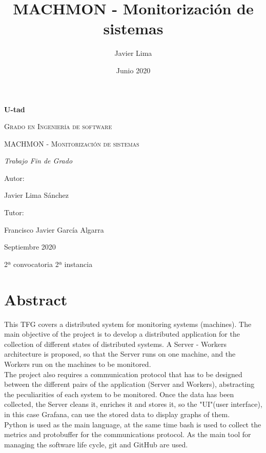 \documentclass[ spanish, a4paper, 12pt, oneside]{report}
\title{\Huge MACHMON - Monitorización de sistemas }
\author{Javier Lima}
\date{Junio 2020}
\begin{document}
\begin{titlepage}
   \centering
   {\bfseries\LARGE U-tad \par}
   \vspace{1cm}
   {\scshape\Large Grado en Ingeniería de software \par}
   \vspace{3cm}
   {\scshape\Huge MACHMON - Monitorización de sistemas \par}
   \vspace{3cm}
   {\itshape\Large Trabajo Fin de Grado \par}
   \vfill
   {\Large Autor: \par}
   {\Large Javier Lima Sánchez\par}
   \vspace{1cm}
   {\Large Tutor: \par}
   {\Large Francisco Javier García Algarra\par}
   \vfill
   {\Large Septiembre 2020\par}
   {\Large 2ª convocatoria 2ª instancia\par}
\end{titlepage}

\tableofcontents{}
\listoffigures
\newpage

\chapter{Abstract}


This TFG covers a distributed system for monitoring systems (machines). The main objective of the project is to develop a distributed application for 
the collection of different states of distributed systems. A Server - Workers architecture is proposed, so that the Server runs on one machine, and the Workers 
run on the machines to be monitored. \\

The project also requires a communication protocol that has to be designed between the different pairs of the application (Server and Workers), abstracting 
the peculiarities of each system to be monitored. Once the data has been collected, the Server cleans it, enriches it and stores it, so the "UI"(user interface), 
in this case Grafana, can use the stored data to display graphs of them. \\

Python is used as the main language, at the same time bash is used to collect the metrics and protobuffer for the communications protocol. As the main tool for 
managing the software life cycle, git and GitHub are used. \\
\end{document}
